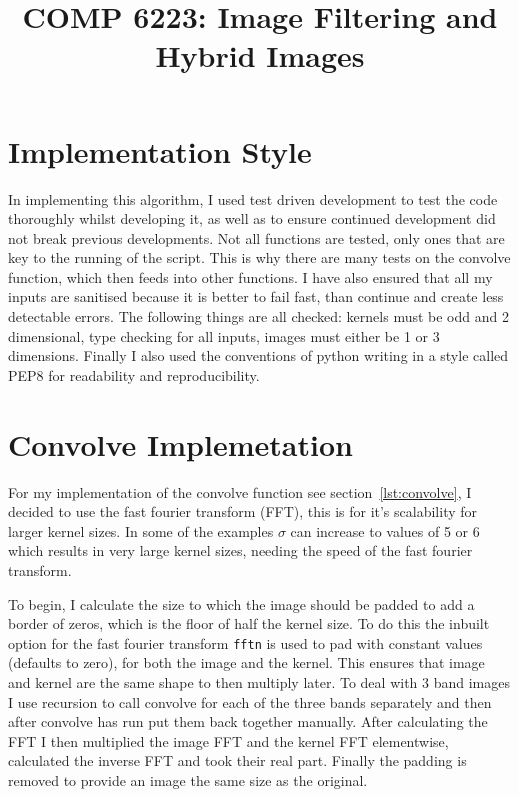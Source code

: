 \documentclass[a4paper,10pt]{article}
\title{COMP 6223: Image Filtering and Hybrid Images}
\date{}
\author{}
\begin{document}
\maketitle
\thispagestyle{fancy}

\section{Implementation Style}
In implementing this algorithm, I used test driven development to test the code
thoroughly whilst developing it, as well as to ensure continued development did
not break previous developments. Not all functions are tested, only ones that
are key to the running of the script. This is why there are many tests on the
convolve function, which then feeds into other functions. I have also ensured
that all my inputs are sanitised because it is better to fail fast, than continue
and create less detectable errors. The following things are all checked: kernels
must be odd and 2 dimensional, type checking for all inputs, images must either
be 1 or 3 dimensions. Finally I also used the conventions of python writing in
a style called PEP8 for readability and reproducibility.

\section{Convolve Implemetation}
For my implementation of the convolve function see section~\ref{lst:convolve}, I
decided to use the fast fourier transform (FFT), this is for it's scalability
for larger kernel sizes. In some of the examples $\sigma$ can increase to values
of 5 or 6 which results in very large kernel sizes, needing the speed of the
fast fourier transform.

To begin, I calculate the size to which the image should be padded to add a border of
zeros, which is the floor of half the kernel size. To do this the inbuilt option
for the fast fourier transform \lstinline|fftn| is used to pad with constant
values (defaults to zero), for both the image and the kernel. This ensures that
image and kernel are the same shape to then multiply later. To deal with 3 band
images I use recursion to call convolve for each of the three bands separately
and then after convolve has run put them back together manually. After
calculating the FFT I then multiplied the image FFT and the kernel FFT
elementwise, calculated the inverse FFT and took their real part. Finally the
padding is removed to provide an image the same size as the original.
\end{document}
